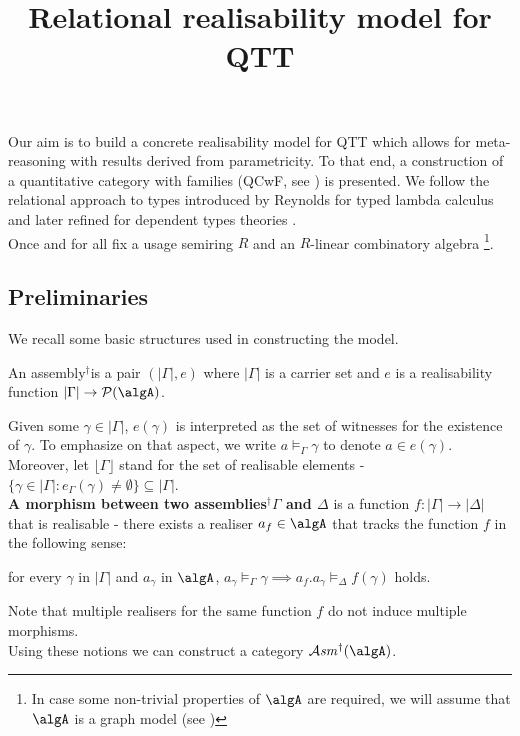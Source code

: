 \documentclass[12pt,a4paper]{article}
\title{\vspace{-5em} Relational realisability model for QTT}
\date{\vspace{-3em}}
\def\cAsm{\mathcal{A}\mathit{sm}^\dagger(\algA)}
\def\Assemblies{Assemblies$^\dagger$\xspace}
\def\assembly{assembly$^\dagger$\xspace}
\def\assemblies{assemblies$^\dagger$\xspace}
\begin{document}
\maketitle

Our aim is to build a concrete realisability model for QTT which allows for meta-reasoning with results derived from parametricity. To that end, a construction of a quantitative category with families (QCwF, see \cite{Atkey2018}) is presented. We follow the relational approach to types introduced by Reynolds for typed lambda calculus \cite{Ma1992} and later refined for dependent types theories \cite{Atkey2014a}.\\

Once and for all fix a usage semiring $R$ and an $R$-linear combinatory algebra \algA\footnote{In case some non-trivial properties of $\algA$ are required, we will assume that $\algA$ is a graph model (see \cite{Engeler1981})}.

\subsection{Preliminaries}
We recall some basic structures used in constructing the model.
\begin{definition}[\Assemblies]
  An \assembly \Gamma is a pair $(|\Gamma|, e)$ where $|\Gamma|$ is a carrier set and  $e$ is a realisability function $|\Gamma| \to \pow(\algA)$.
\end{definition}
Given some $\gamma \in |\Gamma|$, $e(\gamma)$ is interpreted as the set of witnesses for the existence of $\gamma$. To emphasize on that aspect, we write $a \vDash_\Gamma \gamma$ to denote $a \in e(\gamma)$. Moreover, let $\lfloor\Gamma\rfloor$ stand for the set of realisable elements - $\{ \gamma \in |\Gamma| : e_\Gamma(\gamma) \neq \emptyset \} \subseteq |\Gamma|$.\\

\textbf{A morphism between two \assemblies $\Gamma$ and $\Delta$} is a function $f : |\Gamma| \to |\Delta|$ that is realisable - there exists a realiser $a_f \in \algA$ that tracks the function $f$ in the following sense:
\begin{center}
  for every $\gamma$ in $|\Gamma|$ and $a_\gamma$ in $\algA$,  $a_\gamma \vDash_\Gamma \gamma \implies a_f . a_\gamma \vDash_\Delta f(\gamma)$ holds.
\end{center}

Note that multiple realisers for the same function $f$ do not induce multiple morphisms.\\ 
Using these notions we can construct a category $\mathbf{\cAsm}$.
\end{document}
